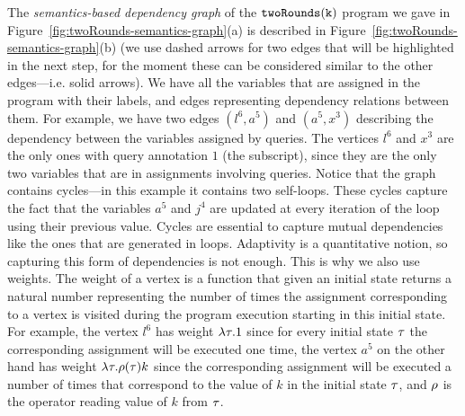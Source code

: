 \begin{example}
The \emph{semantics-based dependency graph} of the $\mathtt{twoRounds(k)}$ program
we gave in Figure~\ref{fig:twoRounds-semantics-graph}(a) is described in Figure~\ref{fig:twoRounds-semantics-graph}(b) (we use dashed arrows for two edges that will be highlighted in the next step, for the moment these can be considered similar to the other edges---i.e. solid arrows). We have all the variables that are assigned in the program with their labels, and edges representing dependency relations between them. 
For example, we have two edges $(l^6, a^5)$ and $(a^5, x^3)$ describing the dependency between the variables assigned by queries. The vertices $l^6$ and $x^3$ are the only ones with query annotation $1$ (the subscript), since they are the only two variables that are in assignments involving  queries. Notice that the graph contains cycles---in this example it contains two self-loops. These cycles capture the fact that the variables $a^5$ and $j^4$ are updated at every iteration of the loop using their previous value. Cycles are essential to capture mutual dependencies like the ones that are generated in loops. Adaptivity is a quantitative notion, so capturing this form of dependencies is not enough. This is why we also use weights. The weight of a vertex is a function that given an initial state returns a natural number representing 
the number of times the assignment corresponding to a vertex is visited during the program execution starting in this initial state.  
For example, the vertex $l^{6}$ has weight {$\lambda \mathtt{\tau}.1$} since for every initial state {$\mathtt{\tau}$} the corresponding assignment will be executed one time, the vertex $a^5$ on the other hand has weight $\lambda \mathtt{\tau}. \rho(\mathtt{\tau}) k$ since the corresponding assignment will be executed a number of times that correspond to the value of $k$ in the initial state $\mathtt{\tau}$, and $\rho$ is the operator reading value of $k$ from $\mathtt{\tau}$.


\end{example}
